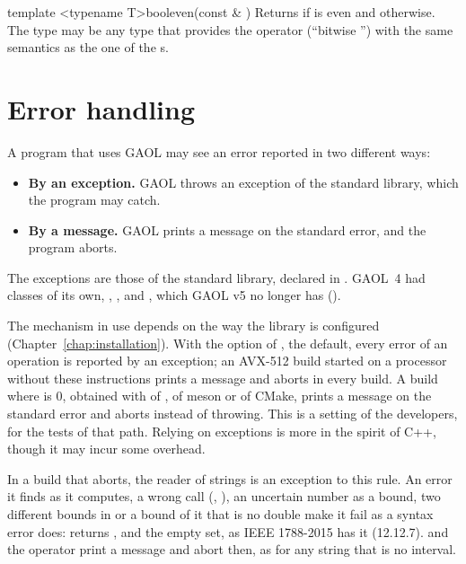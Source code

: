 \begin{defTfun}{template <typename T>}{bool}{even}{(const \& )}
  Returns  if  is even and  otherwise. The type
   may be any type that provides the operator \code{\&} (``bitwise
  '') with the same semantics as the one of the s.
\end{defTfun}

\section{Error handling}\label{sec:errors-handling}
%

A program that uses GAOL may see an error reported in two different ways:
\begin{itemize}
\item[$\bullet$] \textbf{By an exception.} GAOL throws an exception of the
  standard library, which the program may catch.
\item[$\bullet$] \textbf{By a message.} GAOL prints a message on the
  standard error, and the program aborts.
\end{itemize}

\noindent
The exceptions are those of the standard library, declared in
. GAOL~4 had classes of its own, ,
,  and
, which GAOL v5 no longer has
().\newinvfive

\medskip
The mechanism in use depends on the way the library is configured
(Chapter~\ref{chap:installation}). With the option
 of , the default, every error of an operation
is reported by an exception; an AVX-512 build started on a processor without these instructions prints a message and aborts in every build. A build where
 is 0, obtained with 
of ,  of meson or
 of CMake, prints a
message on the standard error and aborts instead of throwing. This is a setting
of the developers, for the tests of that path. Relying on exceptions is more in the
spirit of C++, though it may incur some overhead.

\begin{Rem}
In a build that aborts, the reader of strings is an exception to this rule. An error it
finds as it computes, a wrong call (,
), an uncertain number as a bound, two different bounds in
 or a bound of it that is no double make it fail as a syntax
error does:  returns , and
 the empty set, as IEEE 1788-2015 has
it (12.12.7).
 and the operator \code{>{}>} print a message
and abort then, as for any string that is no interval.\newinvfive
\end{Rem}

